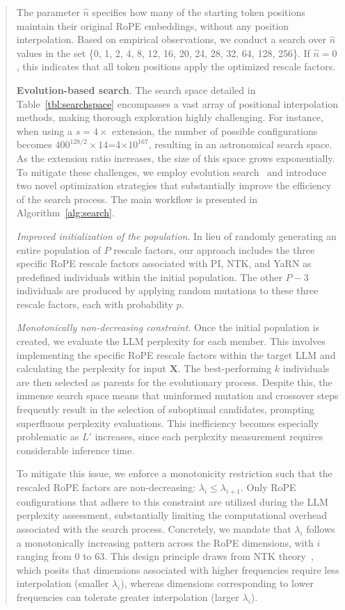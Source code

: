 \begin{abstract}
The parameter $\hat{n}$ specifies how many of the starting token positions maintain their original RoPE embeddings, without any position interpolation. Based on empirical observations, we conduct a search over $\hat{n}$ values in the set \{0, 1, 2, 4, 8, 12, 16, 20, 24, 28, 32, 64, 128, 256\}. If $\hat{n}=0$, this indicates that all token positions apply the optimized rescale factors.

\textbf{Evolution-based search}. The search space detailed in Table~\ref{tbl:searchspace} encompasses a vast array of positional interpolation methods, making thorough exploration highly challenging. For instance, when using a $s=4\times$ extension, the number of possible configurations becomes $400^{128/2}\times14$=4$\times10^{167}$, resulting in an astronomical search space. As the extension ratio increases, the size of this space grows exponentially. To mitigate these challenges, we employ evolution search~\cite{guo2020single} and introduce two novel optimization strategies that substantially improve the efficiency of the search process. The main workflow is presented in Algorithm~\ref{alg:search}.

\textit{Improved initialization of the population}. In lieu of randomly generating an entire population of $P$ rescale factors, our approach includes the three specific RoPE rescale factors associated with PI, NTK, and YaRN as predefined individuals within the initial population. The other $P-3$ individuals are produced by applying random mutations to these three rescale factors, each with probability $p$.

\textit{Monotonically non-decreasing constraint}. Once the initial population is created, we evaluate the LLM perplexity for each member. This involves implementing the specific RoPE rescale factors within the target LLM and calculating the perplexity for input $\mathbf{X}$. The best-performing $k$ individuals are then selected as parents for the evolutionary process. Despite this, the immense search space means that uninformed mutation and crossover steps frequently result in the selection of suboptimal candidates, prompting superfluous perplexity evaluations. This inefficiency becomes especially problematic as $L'$ increases, since each perplexity measurement requires considerable inference time.

To mitigate this issue, we enforce a monotonicity restriction such that the rescaled RoPE factors are non-decreasing: $\lambda_i\le \lambda_{i+1}$. Only RoPE configurations that adhere to this constraint are utilized during the LLM perplexity assessment, substantially limiting the computational overhead associated with the search process. Concretely, we mandate that $\lambda_i$ follows a monotonically increasing pattern across the RoPE dimensions, with $i$ ranging from 0 to 63. This design principle draws from NTK theory~\cite{jacot2018neural,tancik2020fourier,ntk}, which posits that dimensions associated with higher frequencies require less interpolation (smaller $\lambda_i$), whereas dimensions corresponding to lower frequencies can tolerate greater interpolation (larger $\lambda_i$).


\end{abstract}
